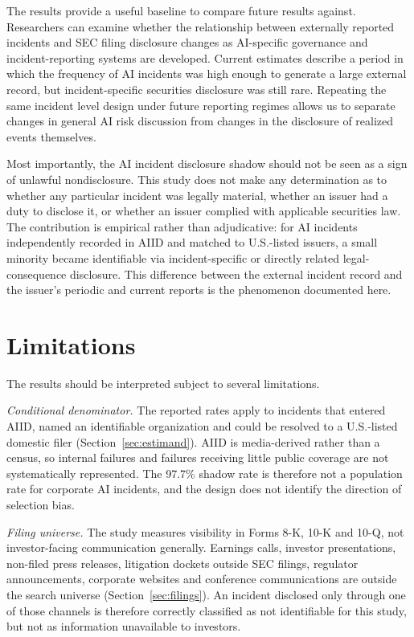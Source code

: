 \documentclass[utf8]{FrontiersinHarvard}
\begin{document}
The results provide a useful baseline to compare future results against. Researchers can examine whether the relationship between externally reported incidents and SEC filing disclosure changes as AI-specific governance and incident-reporting systems are developed. Current estimates describe a period in which the frequency of AI incidents was high enough to generate a large external record, but incident-specific securities disclosure was still rare. Repeating the same incident level design under future reporting regimes allows us to separate changes in general AI risk discussion from changes in the disclosure of realized events themselves.

Most importantly, the AI incident disclosure shadow should not be seen as a sign of unlawful nondisclosure. This study does not make any determination as to whether any particular incident was legally material, whether an issuer had a duty to disclose it, or whether an issuer complied with applicable securities law. The contribution is empirical rather than adjudicative: for AI incidents independently recorded in AIID and matched to U.S.-listed issuers, a small minority became identifiable via incident-specific or directly related legal-consequence disclosure. This difference between the external incident record and the issuer's periodic and current reports is the phenomenon documented here.

\section{Limitations}

The results should be interpreted subject to several limitations.

\textit{Conditional denominator.} The reported rates apply to incidents that entered AIID, named an identifiable organization and could be resolved to a U.S.-listed domestic filer (Section~\ref{sec:estimand}). AIID is media-derived rather than a census, so internal failures and failures receiving little public coverage are not systematically represented. The 97.7\% shadow rate is therefore not a population rate for corporate AI incidents, and the design does not identify the direction of selection bias.

\textit{Filing universe.} The study measures visibility in Forms 8-K, 10-K and 10-Q, not investor-facing communication generally. Earnings calls, investor presentations, non-filed press releases, litigation dockets outside SEC filings, regulator announcements, corporate websites and conference communications are outside the search universe (Section~\ref{sec:filings}). An incident disclosed only through one of those channels is therefore correctly classified as not identifiable for this study, but not as information unavailable to investors.
\end{document}
